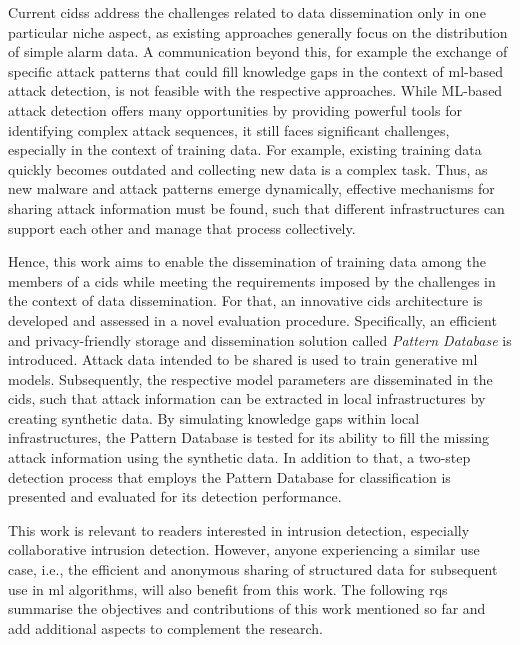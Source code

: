 \documentclass[../../main.tex]{subfiles}
\begin{document}
Current \glspl{cids} address the challenges related to data dissemination only in one particular niche aspect, as existing approaches generally focus on the distribution of simple alarm data. A communication beyond this, for example the exchange of specific attack patterns that could fill knowledge gaps in the context of \gls{ml}-based attack detection, is not feasible with the respective approaches. While ML-based attack detection offers many opportunities by providing powerful tools for identifying complex attack sequences, it still faces significant challenges, especially in the context of training data. For example, existing training data quickly becomes outdated and collecting new data is a complex task. Thus, as new malware and attack patterns emerge dynamically, effective mechanisms for sharing attack information must be found, such that different infrastructures can support each other and manage that process collectively. 

Hence, this work aims to enable the dissemination of training data among the members of a \gls{cids} while meeting the requirements imposed by the challenges in the context of data dissemination. For that, an innovative \gls{cids} architecture is developed and assessed in a novel evaluation procedure. Specifically, an efficient and privacy-friendly storage and dissemination solution called \textit{Pattern Database} is introduced. Attack data intended to be shared is used to train generative \gls{ml} models. Subsequently, the respective model parameters are disseminated in the \gls{cids}, such that attack information can be extracted in local infrastructures by creating synthetic data. By simulating knowledge gaps within local infrastructures, the Pattern Database is tested for its ability to fill the missing attack information using the synthetic data. In addition to that, a two-step detection process that employs the Pattern Database for classification is presented and evaluated for its detection performance.

This work is relevant to readers interested in intrusion detection, especially collaborative intrusion detection. However, anyone experiencing a similar use case, i.e., the efficient and anonymous sharing of structured data for subsequent use in \gls{ml} algorithms, will also benefit from this work. The following \glspl{rq} summarise the objectives and contributions of this work mentioned so far and add additional aspects to complement the research.
\end{document}
